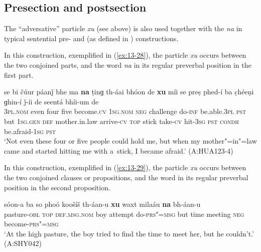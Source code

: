 
\subsection{Presection and postsection}
\label{subsec:13-2-2}

The ``adversative'' particle \textit{xu} (see above) is also used together with the  \textit{na} in typical sentential pre- and  (as defined in ) constructions.


 In this construction, exemplified in (\ref{ex:13-28}), the particle \textit{xu} occurs between the two conjoined parts, and the  word \textit{na} in its regular preverbal position in the first part.

\ea
\label{ex:13-28}
\gll se bi čúur páanǰ bhe ma \textbf{na} ṭinɡ th-áai bhóon de \textbf{xu} míi se preṣ phed-í ba c̣héeṇi ɡhin-í ǰ-íi de seentá bhíi-um de\\
\textsc{3pl.nom} even four five become.\textsc{cv} \textsc{1sg.nom} \textsc{neg}  challenge do-\textsc{inf} be.able.\textsc{3pl} \textsc{pst} but \textsc{1sg.gen}  \textsc{def} mother.in.law arrive-\textsc{cv} \textsc{top} stick take-\textsc{cv} hit-\textsc{3sg} \textsc{pst} \textsc{condh} be.afraid-\textsc{1sg} \textsc{pst}\\
\glt `Not even these four or five people could hold me, but when my mother"=in"=law came and started hitting me with a~stick, I became afraid.' (A:HUA123-4) 
\z

 In this construction, exemplified in (\ref{ex:13-29}), the particle \textit{xu} occurs between the two conjoined clauses or propositions, and the  word in its regular preverbal position in the second proposition.

\begin{exe}
\ex
\label{ex:13-29}
\gll sóon-a ba so phoó koošíš th-áan-u \textbf{xu} waxt milaáu \textbf{na} bh-áan-u \\
pasture-\textsc{obl} \textsc{top} \textsc{def.msg.nom} boy attempt   do-\textsc{prs"=msg} but time meeting \textsc{neg} become-\textsc{prs"=msg} \\
\glt `At the high pasture, the boy tried to find the time to meet her, but he couldn't.' (A:SHY042) 
\end{exe}

